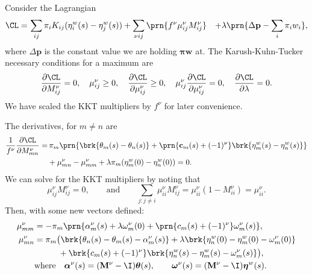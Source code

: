 \documentclass[12pt]{article}
\newcommand{\prm}{p}
\newcommand{\pr}{\mathbf{\prm}}
\newcommand{\eqm}{\pi}
\newcommand{\eq}{\boldsymbol{\eqm}}
\newcommand{\etwm}{\eta^w}
\newcommand{\etw}{\boldsymbol{\eta}^w}
\newcommand{\thbm}{\theta}
\newcommand{\thb}{\boldsymbol{\thbm}}
\newcommand{\ombm}{\omega}
\newcommand{\omb}{\boldsymbol{\ombm}}
\newcommand{\albm}{\alpha}
\newcommand{\alb}{\boldsymbol{\albm}}
\newcommand{\wm}{w}
\newcommand{\w}{\mathbf{\wm}}
\newcommand{\MMdm}{M}
\newcommand{\MMd}{\mathbf{\MMdm}}
\newcommand{\encm}{K}
\renewcommand{\pdiff}[2]{\frac{\partial #1}{\partial #2}}
\begin{document}
Consider the Lagrangian
%
\begin{equation}\label{eq:finitelagrangian}
\begin{aligned}
  \CL =&\, \sum_{ij} \eqm_i \encm_{ij} (\etwm_i(s) - \etwm_j(s))
        +\sum_{\nu i j} \prn{ f^\nu \mu^\nu_{ij} \MMdm^\nu_{ij} }
        &+ \lambda \prn{ \Delta\pr - \sum_i \eqm_i \wm_i },
\end{aligned}
\end{equation}
%
where \(\Delta\pr\) is the constant value we are holding \(\eq\w\) at.
The Karush-Kuhn-Tucker necessary conditions for a maximum are
%
\begin{equation}\label{eq:KTfinite}
  \pdiff{\CL}{\MMdm^\nu_{ij}} = 0, \quad
  \mu^\nu_{ij} \geq 0, \quad
  \pdiff{\CL}{\mu^\nu_{ij}} \geq 0, \quad
  \mu^\nu_{ij}\pdiff{\CL}{\mu^\nu_{ij}} = 0, \quad
  \pdiff{\CL}{\lambda} = 0.
\end{equation}
%
We have scaled the KKT multipliers by \(f^\nu\) for later convenience.

The derivatives, for \(m \neq n\) are
%
\begin{equation}\label{eq:finitederivs}
\begin{aligned}
  \frac{1}{f^\nu} \pdiff{\CL}{\MMdm^\nu_{mn}} = & \,
    \eqm_m \prn{ \brk{\thbm_m(s) - \thbm_n(s)}
     + \prn{\mathbf{c}_m(s) + (-1)^\nu} \brk{\etwm_m(s) - \etwm_n(s)} } \\
     &+ \mu^\nu_{mn} -  \mu^\nu_{mm}
     + \lambda \eqm_m (\etwm_{m}(0)-\etwm_{n}(0)) 
    = 0.
\end{aligned}
\end{equation}
%
We can solve for the KKT multipliers by noting that
%
\begin{equation*}
  \mu^\nu_{ij} \MMdm^\nu_{ij} = 0,
  \qquad \text{and} \qquad
  \sum_{j: j \neq i} \mu^\nu_{ii} \MMdm^\nu_{ij} 
      = \mu^\nu_{ii} (1 - \MMdm^\nu_{ii}) = \mu^\nu_{ii}.
\end{equation*}
%
Then, with some new vectors defined:
%
\begin{equation}\label{eq:kktsol}
\begin{aligned}
  \mu^\nu_{mm} &= - \eqm_m \prn{ \albm^\nu_m(s) 
    + \lambda \ombm^\nu_m(0) 
    + \prn{{c}_m(s) + (-1)^\nu} \ombm^\nu_m(s)
    }, \\
  \mu^\nu_{mn} &= \eqm_m \big( 
      \brk{ \thbm_n(s) - \thbm_m(s) - \albm^\nu_m(s) }
    + \lambda \brk{ \etwm_n(0) - \etwm_m(0) - \ombm^\nu_m(0) } 
  \\ &\phantom{= \eqm_m \big( }
    + \brk{{c}_m(s) + (-1)^\nu} 
        \brk{ \etwm_n(s) - \etwm_m(s) - \ombm^\nu_m(s) }
     \big), \\
  &\text{where} \quad 
  \alb^\nu(s) = (\MMd^\nu - \I) \thb(s), \qquad
  \omb^\nu(s) = (\MMd^\nu - \I) \etw(s).
\end{aligned}
\end{equation}
%
\end{document}
